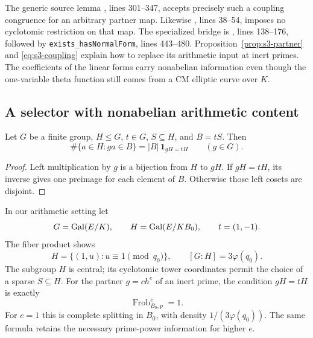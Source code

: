The generic source lemma
,
lines 301--347, accepts precisely such a coupling congruence for an
arbitrary partner map. Likewise
,
lines 38--54, imposes no cyclotomic restriction on that map.
The specialized bridge is
,
lines 138--176, followed by \texttt{exists\_hasNormalForm},
lines 443--480. Proposition~\ref{prop:s3-partner} and
\eqref{eq:s3-coupling} explain how to replace its arithmetic input
at inert primes. The coefficients of the linear forms carry
nonabelian information even though the one-variable theta function
still comes from a CM elliptic curve over $K$.

\subsection{A selector with nonabelian arithmetic content}

\begin{lemma}\label{lem:s3-coset}
Let $G$ be a finite group, $H\le G$, $t\in G$, $S\subseteq H$,
and $B=tS$. Then
\begin{equation}\label{eq:s3-coset}
 \#\{a\in H:ga\in B\}=|B|\,\mathbf1_{gH=tH}
 \qquad(g\in G).
\end{equation}
\end{lemma}

\begin{proof}
Left multiplication by $g$ is a bijection from $H$ to $gH$.
If $gH=tH$, its inverse gives one preimage for each element of $B$.
Otherwise those left cosets are disjoint.
\end{proof}

In our arithmetic setting let
\[
 G=\operatorname{Gal}(E/K),\qquad H=\operatorname{Gal}(E/KB_0),\qquad t=(1,-1).
\]
The fiber product shows
\[
 H=\{(1,u):u\equiv1\pmod{q_0}\},\qquad
 [G:H]=3\varphi(q_0).
\]
The subgroup $H$ is central; its cyclotomic tower coordinates permit
the choice of a sparse $S\subseteq H$. For the partner
$g=c h^e$ of an inert prime, the condition $gH=tH$ is exactly
\begin{equation}\label{eq:s3-split-selector}
 \operatorname{Frob}_{B_0,p}^{e}=1.
\end{equation}
For $e=1$ this is complete splitting in $B_0$, with density
$1/(3\varphi(q_0))$. The same formula retains the necessary
prime-power information for higher $e$.


